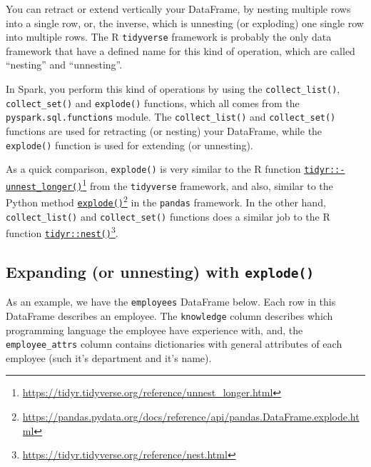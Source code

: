 \documentclass[
  11pt,
  letterpaper,
  DIV=11,
  numbers=noendperiod]{scrreprt}
\begin{document}
You can retract or extend vertically your DataFrame, by nesting multiple
rows into a single row, or, the inverse, which is unnesting (or
exploding) one single row into multiple rows. The R \texttt{tidyverse}
framework is probably the only data framework that have a defined name
for this kind of operation, which are called ``nesting'' and
``unnesting''.

In Spark, you perform this kind of operations by using the
\texttt{collect\_list()}, \texttt{collect\_set()} and \texttt{explode()}
functions, which all comes from the \texttt{pyspark.sql.functions}
module. The \texttt{collect\_list()} and \texttt{collect\_set()}
functions are used for retracting (or nesting) your DataFrame, while the
\texttt{explode()} function is used for extending (or unnesting).

As a quick comparison, \texttt{explode()} is very similar to the R
function
\href{https://tidyr.tidyverse.org/reference/unnest_longer.html}{\texttt{tidyr::-unnest\_longer()}}\footnote{\url{https://tidyr.tidyverse.org/reference/unnest_longer.html}}
from the \texttt{tidyverse} framework, and also, similar to the Python
method
\href{https://pandas.pydata.org/docs/reference/api/pandas.DataFrame.explode.html}{\texttt{explode()}}\footnote{\url{https://pandas.pydata.org/docs/reference/api/pandas.DataFrame.explode.html}}
in the \texttt{pandas} framework. In the other hand,
\texttt{collect\_list()} and \texttt{collect\_set()} functions does a
similar job to the R function
\href{https://tidyr.tidyverse.org/reference/nest.html}{\texttt{tidyr::nest()}}\footnote{\url{https://tidyr.tidyverse.org/reference/nest.html}}.

\subsection{\texorpdfstring{Expanding (or unnesting) with
\texttt{explode()}}{Expanding (or unnesting) with explode()}}\label{expanding-or-unnesting-with-explode}

As an example, we have the \texttt{employees} DataFrame below. Each row
in this DataFrame describes an employee. The \texttt{knowledge} column
describes which programming language the employee have experience with,
and, the \texttt{employee\_attrs} column contains dictionaries with
general attributes of each employee (such it's department and it's
name).
\end{document}
